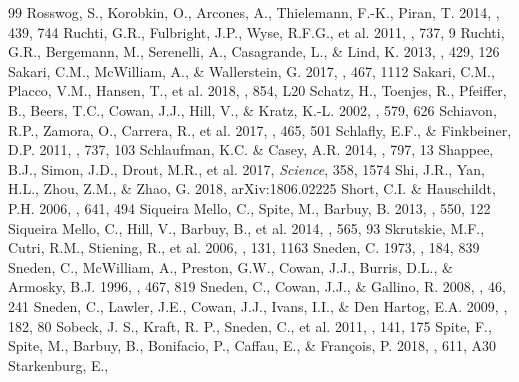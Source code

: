 \documentclass[preprint]{aastex61}
\begin{document}
{\begin{thebibliography}{99}
 Rosswog, S., Korobkin,
  O., Arcones, A., Thielemann, F.-K., Piran, T. 2014, \mnras, 439, 744
 Ruchti, G.R., Fulbright,
  J.P., Wyse, R.F.G., et al. 2011, \apj, 737, 9
 Ruchti, G.R., Bergemann,
  M., Serenelli, A., Casagrande, L., \& Lind, K. 2013, \mnras, 429,
  126
 Sakari, C.M., McWilliam,
  A., \& Wallerstein, G. 2017, \mnras, 467, 1112
 Sakari, C.M., Placco, V.M.,
  Hansen, T., et al. 2018, \apjl, 854, L20
 Schatz, H., Toenjes, R.,
  Pfeiffer, B., Beers, T.C., Cowan, J.J., Hill, V., \& Kratz,
  K.-L. 2002, \apj, 579, 626
 Schiavon, R.P., Zamora,
  O., Carrera, R., et al. 2017, \mnras, 465, 501
  Schlafly, E.F., \& Finkbeiner, D.P. 2011, \apj, 737, 103
 Schlaufman, K.C. \&
  Casey, A.R. 2014, \apj, 797, 13
 Shappee, B.J., Simon,
  J.D., Drout, M.R., et al. 2017, {\it Science}, 358, 1574
 Shi, J.R., Yan, H.L., Zhou, Z.M.,
  \& Zhao, G. 2018, arXiv:1806.02225
 Short,
  C.I. \& Hauschildt, P.H. 2006, \apj, 641, 494
 Siqueira
  Mello, C., Spite, M., Barbuy, B. 2013, \aap, 550, 122
 Siqueira
  Mello, C., Hill, V., Barbuy, B., et al. 2014, \aap, 565, 93
 Skrutskie, M.F., Cutri,
  R.M., Stiening, R., et al. 2006, \aj, 131, 1163
 Sneden, C. 1973, \apj, 184, 839
 Sneden, C., McWilliam, A.,
  Preston, G.W., Cowan, J.J., Burris, D.L., \& Armosky, B.J. 1996,
  \apj, 467, 819
 Sneden, C., Cowan, J.J., \&
  Gallino, R. 2008, \araa, 46, 241
 Sneden, C., Lawler, J.E.,
  Cowan, J.J., Ivans, I.I., \& Den Hartog, E.A. 2009, \apjs, 182, 80 
 Sobeck, J. S., Kraft,
  R. P., Sneden, C., et al. 2011, \aj, 141, 175
 Spite, F., Spite, M., Barbuy,
  B., Bonifacio, P., Caffau, E., \& Fran\c{c}ois, P. 2018, \aap, 611,
  A30 
 Starkenburg, E.,

\end{thebibliography}}
\end{document}
